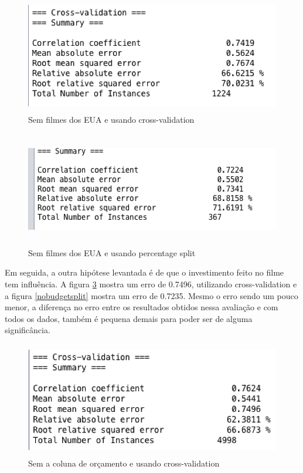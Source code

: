\begin{figure}[H]
\centering
\includegraphics[height=5cm]{imagens/sem_usa_cv.png}
\caption{Sem filmes dos EUA e usando cross-validation}
\label{nousacv}
\end{figure}

\begin{figure}[H]
\centering
\includegraphics[height=5cm]{imagens/sem_usa_split.png}
\caption{Sem filmes dos EUA e usando percentage split}
\label{nousasplit}
\end{figure}


Em seguida, a outra hipótese levantada é de que o investimento feito no filme tem influência. A figura \ref{nobudgetcv} mostra um erro de 0.7496, utilizando cross-validation e a figura \ref{nobudgetsplit} mostra um erro de 0.7235. Mesmo o erro sendo um pouco menor, a diferença no erro entre os resultados obtidos nessa avaliação e com todos os dados, também é pequena demais para poder ser de alguma significância.

\begin{figure}[H]
\centering
\includegraphics[height=5cm]{imagens/no_budget_cv.png}
\caption{Sem a coluna de orçamento e usando cross-validation}
\label{nobudgetcv}
\end{figure}

